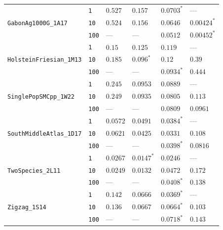 \documentclass{article}
\begin{document}
\begin{footnotesize}
\begin{tabular}{llllll}
\multirow[c]{3}{*}{\texttt{GabonAg1000G\_1A17}} & \texttt{1} & $0.527$ & $0.157$ & $\mathbf{0.0703}^*$ & --- \\
 & \texttt{10} & $0.524$ & $0.156$ & $0.0646$ & $\mathbf{0.00424}^*$ \\
 & \texttt{100} & --- & --- & $0.0512$ & $\mathbf{0.00452}^*$ \\
\cline{1-6}
\multirow[c]{3}{*}{\texttt{HolsteinFriesian\_1M13}} & \texttt{1} & $0.15$ & $0.125$ & $\mathbf{0.119}$ & --- \\
 & \texttt{10} & $0.185$ & $\mathbf{0.096}^*$ & $0.12$ & $0.39$ \\
 & \texttt{100} & --- & --- & $\mathbf{0.0934}^*$ & $0.444$ \\
\cline{1-6}
\multirow[c]{3}{*}{\texttt{SinglePopSMCpp\_1W22}} & \texttt{1} & $0.245$ & $0.0953$ & $\mathbf{0.0889}$ & --- \\
 & \texttt{10} & $0.249$ & $0.0935$ & $\mathbf{0.0805}$ & $0.113$ \\
 & \texttt{100} & --- & --- & $\mathbf{0.0809}$ & $0.0961$ \\
\cline{1-6}
\multirow[c]{3}{*}{\texttt{SouthMiddleAtlas\_1D17}} & \texttt{1} & $0.0572$ & $0.0491$ & $\mathbf{0.0384}^*$ & --- \\
 & \texttt{10} & $0.0621$ & $0.0425$ & $\mathbf{0.0331}$ & $0.108$ \\
 & \texttt{100} & --- & --- & $\mathbf{0.0398}^*$ & $0.0816$ \\
\cline{1-6}
\multirow[c]{3}{*}{\texttt{TwoSpecies\_2L11}} & \texttt{1} & $0.0267$ & $\mathbf{0.0147}^*$ & $0.0246$ & --- \\
 & \texttt{10} & $0.0249$ & $\mathbf{0.0132}$ & $0.0472$ & $0.172$ \\
 & \texttt{100} & --- & --- & $\mathbf{0.0408}^*$ & $0.138$ \\
\cline{1-6}
\multirow[c]{3}{*}{\texttt{Zigzag\_1S14}} & \texttt{1} & $0.142$ & $0.0666$ & $\mathbf{0.0369}^*$ & --- \\
 & \texttt{10} & $0.136$ & $0.0667$ & $\mathbf{0.0664}^*$ & $0.103$ \\
 & \texttt{100} & --- & --- & $\mathbf{0.0718}^*$ & $0.143$ \\
\cline{1-6}
\bottomrule
\end{tabular}
\end{footnotesize}
\end{document}
